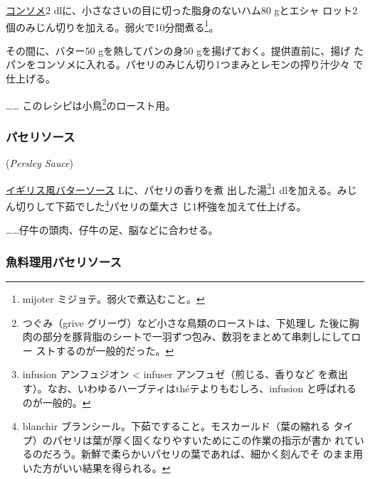 \begin{recette}
\protect\hyperlink{}{コンソメ}2
dlに、小さなさいの目に切った脂身のないハム80 gとエシャ
ロット2個のみじん切りを加える。弱火で10分間煮る\footnote{mijoter
  ミジョテ。弱火で煮込むこと。}。

その間に、バター50 gを熱してパンの身50 gを揚げておく。提供直前に、揚げ
たパンをコンソメに入れる。パセリのみじん切り1つまみとレモンの搾り汁少々
で仕上げる。

\ldots{}\ldots{} このレシピは小鳥\footnote{つぐみ（grive
  グリーヴ）など小さな鳥類のローストは、下処理し
  た後に胸肉の部分を豚背脂のシートで一羽ずつ包み、数羽をまとめて串刺しにしてロー
  ストするのが一般的だった。}のロースト用。

\maeaki

\hypertarget{perseley-sauce}{%
\subsubsection{パセリソース}\label{perseley-sauce}}

 (\emph{Persley Sauce})


\protect\hyperlink{bread-sauce}{イギリス風バターソース}\undemi{}
Lに、パセリの香りを煮 出した湯\footnote{infusion アンフュジオン
  \textless{} infuser アンフュゼ（煎じる、香りなど
  を煮出す）。なお、いわゆるハーブティはthéテよりもむしろ、infusion
  と呼ばれるのが一般的。}1
dlを加える。みじん切りして下茹でした\footnote{blanchir
  ブランシール。下茹ですること。モスカールド（葉の縮れる
  タイプ）のパセリは葉が厚く固くなりやすいためにこの作業の指示が書か
  れているのだろう。新鮮で柔らかいパセリの葉であれば、細かく刻んでそ
  のまま用いた方がいい結果を得られる。}パセリの葉大さ
じ1杯強を加えて仕上げる。

\ldots{}\ldots{}仔牛の頭肉、仔牛の足、脳などに合わせる。

\maeaki

\hypertarget{ux9b5aux6599ux7406ux7528ux30d1ux30bbux30eaux30bdux30fcux30b9}{%
\subsubsection{魚料理用パセリソース}\label{ux9b5aux6599ux7406ux7528ux30d1ux30bbux30eaux30bdux30fcux30b9}}


\end{recette}
